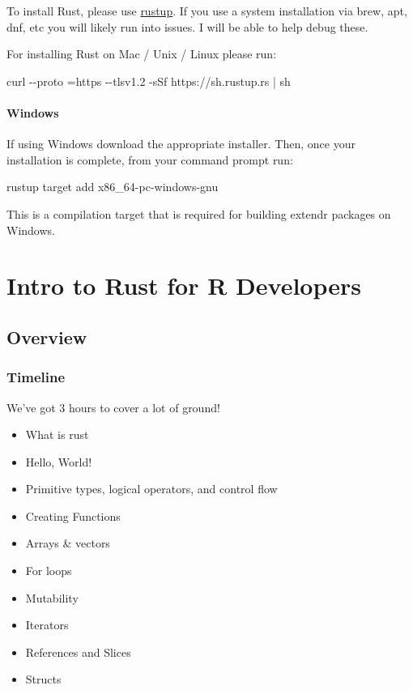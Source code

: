 \documentclass[
  letterpaper,
  DIV=11,
  numbers=noendperiod,
  oneside]{scrreprt}
\newenvironment{Shaded}{\begin{snugshade}}{\end{snugshade}}
\newcommand{\NormalTok}[1]{\textcolor[rgb]{0.00,0.23,0.31}{#1}}
\providecommand{\tightlist}{%
  \setlength{\itemsep}{0pt}\setlength{\parskip}{0pt}}\usepackage{longtable,booktabs,array}
\begin{document}
To install Rust, please use \href{https://rustup.rs/}{rustup}. If you
use a system installation via brew, apt, dnf, etc you will likely run
into issues. I will be able to help debug these.

For installing Rust on Mac / Unix / Linux please run:

\begin{Shaded}
\begin{Highlighting}[]
\NormalTok{curl {-}{-}proto \textquotesingle{}=https\textquotesingle{} {-}{-}tlsv1.2 {-}sSf https://sh.rustup.rs | sh}
\end{Highlighting}
\end{Shaded}

\subsection{Windows}\label{windows}

If using Windows download the appropriate installer. Then, once your
installation is complete, from your command prompt run:

\begin{Shaded}
\begin{Highlighting}[]
\NormalTok{rustup target add x86\_64{-}pc{-}windows{-}gnu}
\end{Highlighting}
\end{Shaded}

This is a compilation target that is required for building extendr
packages on Windows.

\part{Intro to Rust for R Developers}

\chapter{Overview}\label{overview}

\section{Timeline}\label{timeline}

We've got 3 hours to cover a lot of ground!

\begin{itemize}
\tightlist
\item
  What is rust
\item
  Hello, World!
\item
  Primitive types, logical operators, and control flow
\item
  Creating Functions
\item
  Arrays \& vectors
\item
  For loops
\item
  Mutability
\item
  Iterators
\item
  References and Slices
\item
  Structs
\end{itemize}
\end{document}
